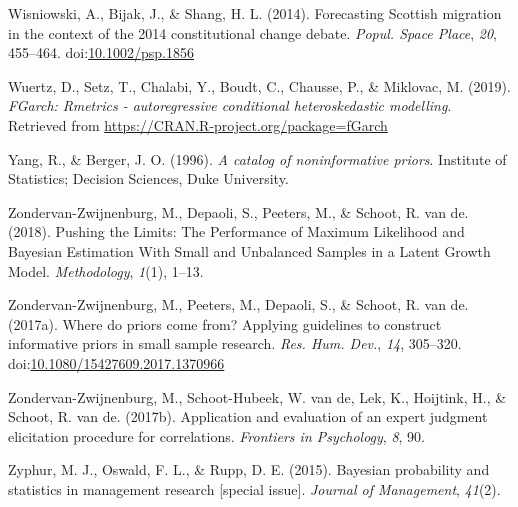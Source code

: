 \documentclass[openright,titlepage,12pt,a4paper]{book}
\begin{document}
\leavevmode\hypertarget{ref-wisniowski_forecasting_2014}{}%
Wisniowski, A., Bijak, J., \& Shang, H. L. (2014). Forecasting Scottish migration in the context of the 2014 constitutional change debate. \emph{Popul. Space Place}, \emph{20}, 455--464. doi:\href{https://doi.org/10.1002/psp.1856}{10.1002/psp.1856}

\leavevmode\hypertarget{ref-R-fGarch}{}%
Wuertz, D., Setz, T., Chalabi, Y., Boudt, C., Chausse, P., \& Miklovac, M. (2019). \emph{FGarch: Rmetrics - autoregressive conditional heteroskedastic modelling}. Retrieved from \url{https://CRAN.R-project.org/package=fGarch}

\leavevmode\hypertarget{ref-yang_catalog_1996}{}%
Yang, R., \& Berger, J. O. (1996). \emph{A catalog of noninformative priors}. Institute of Statistics; Decision Sciences, Duke University.

\leavevmode\hypertarget{ref-zondervan-zwijnenburg_pushing_2018}{}%
Zondervan-Zwijnenburg, M., Depaoli, S., Peeters, M., \& Schoot, R. van de. (2018). Pushing the Limits: The Performance of Maximum Likelihood and Bayesian Estimation With Small and Unbalanced Samples in a Latent Growth Model. \emph{Methodology}, \emph{1}(1), 1--13.

\leavevmode\hypertarget{ref-zondervan-zwijnenburg_where_2017}{}%
Zondervan-Zwijnenburg, M., Peeters, M., Depaoli, S., \& Schoot, R. van de. (2017a). Where do priors come from? Applying guidelines to construct informative priors in small sample research. \emph{Res. Hum. Dev.}, \emph{14}, 305--320. doi:\href{https://doi.org/10.1080/15427609.2017.1370966}{10.1080/15427609.2017.1370966}

\leavevmode\hypertarget{ref-zondervan-zwijnenburg_application_2017}{}%
Zondervan-Zwijnenburg, M., Schoot-Hubeek, W. van de, Lek, K., Hoijtink, H., \& Schoot, R. van de. (2017b). Application and evaluation of an expert judgment elicitation procedure for correlations. \emph{Frontiers in Psychology}, \emph{8}, 90.

\leavevmode\hypertarget{ref-zyphur_bayesian_2015}{}%
Zyphur, M. J., Oswald, F. L., \& Rupp, D. E. (2015). Bayesian probability and statistics in management research {[}special issue{]}. \emph{Journal of Management}, \emph{41}(2).
\end{document}
